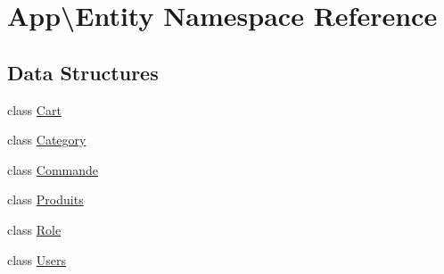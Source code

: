 \hypertarget{namespace_app_1_1_entity}{}\section{App\textbackslash{}Entity Namespace Reference}
\label{namespace_app_1_1_entity}
\subsection*{Data Structures}
\begin{DoxyCompactItemize}
\item 
class \mbox{\hyperlink{class_app_1_1_entity_1_1_cart}{Cart}}
\item 
class \mbox{\hyperlink{class_app_1_1_entity_1_1_category}{Category}}
\item 
class \mbox{\hyperlink{class_app_1_1_entity_1_1_commande}{Commande}}
\item 
class \mbox{\hyperlink{class_app_1_1_entity_1_1_produits}{Produits}}
\item 
class \mbox{\hyperlink{class_app_1_1_entity_1_1_role}{Role}}
\item 
class \mbox{\hyperlink{class_app_1_1_entity_1_1_users}{Users}}
\end{DoxyCompactItemize}
